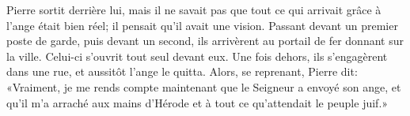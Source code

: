 Pierre sortit derrière lui,
	mais il ne savait pas que tout ce qui arrivait grâce à l’ange était bien réel;
	il pensait qu’il avait une vision.
Passant devant un premier poste de garde, puis devant un second,
	ils arrivèrent au portail de fer donnant sur la ville.
	Celui-ci s’ouvrit tout seul devant eux.
Une fois dehors, ils s’engagèrent dans une rue, et aussitôt l’ange le quitta.
Alors, se reprenant, Pierre dit:
	«Vraiment, je me rends compte maintenant que le Seigneur a envoyé son ange,
	et qu’il m’a arraché aux mains d’Hérode et à tout ce qu’attendait le peuple juif.»

